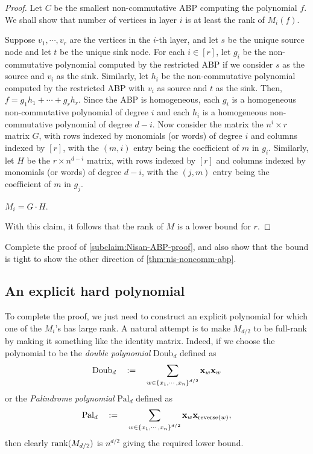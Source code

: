\begin{proof}
Let $C$ be the smallest non-commutative ABP computing the polynomial $f$. We shall show that number of vertices in layer $i$ is at least the rank of $M_i(f)$. 

Suppose $v_1,\cdots, v_r$ are the vertices in the $i$-th layer, and let $s$ be the unique source node and let $t$ be the unique sink node.
For each $i \in [r]$, let $g_i$ be the non-commutative polynomial computed by the restricted ABP if we consider $s$ as the source and $v_i$ as the sink.
Similarly, let $h_i$ be the non-commutative polynomial computed by the restricted ABP with $v_i$ as source and $t$ as the sink.
Then, $f = g_1 h_1 + \cdots + g_r h_r$.
Since the ABP is homogeneous, each $g_i$ is a homogeneous non-commutative polynomial of degree $i$ and each $h_i$ is a homogeneous non-commutative polynomial of degree $d-i$.
Now consider the matrix the $n^i \times r$ matrix $G$, with rows indexed by monomials (or words) of degree $i$ and columns indexed by $[r]$, with the $(m,i)$ entry being the coefficient of $m$ in $g_i$.
Similarly, let $H$ be the $r \times n^{d-i}$ matrix, with rows indexed by $[r]$ and columns indexed by monomials (or words) of degree $d-i$, with the $(j,m)$ entry being the coefficient of $m$ in $g_j$.
\begin{subclaim}\label{subclaim:Nisan-ABP-proof}
$M_i = G \cdot H$. 
\end{subclaim}
\noindent 
With this claim, it follows that the rank of $M$ is a lower bound for $r$. 
\end{proof}

\begin{exercise}
Complete the proof of  \autoref{subclaim:Nisan-ABP-proof}, and also show that the bound is tight to show the other direction of \autoref{thm:nis-noncomm-abp}. 
\end{exercise}

\subsection{An explicit hard polynomial}

To complete the proof, we just need to construct an explicit polynomial for which one of the $M_i$'s has large rank.
A natural attempt is to make $M_{d/2}$ to be full-rank by making it something like the identity matrix.
Indeed, if we choose the polynomial to be the \emph{double polynomial} $\mathrm{Doub}_d$ defined as
\[
\mathrm{Doub}_d \quad := \quad \sum_{w\in \left\{x_1, \cdots, x_n\right\}^{d/2}} \mathbf{x}_{w} \mathbf{x}_w
\]
or the \emph{Palindrome polynomial} $\mathrm{Pal}_d$ defined as
\[
\mathrm{Pal}_d \quad := \quad \sum_{w\in \left\{x_1, \cdots, x_n\right\}^{d/2}} \mathbf{x}_{w} \mathbf{x}_{\mathrm{reverse}(w)},
\]
then clearly $\operatorname{rank}(M_{d/2})$ is $n^{d/2}$ giving the required lower bound. 

